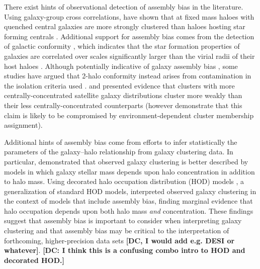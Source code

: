 \documentclass[usenatbib,fleqn]{mnras}
\begin{document}
There exist hints of observational detection of assembly bias in the literature. Using galaxy-group cross correlations, \citet{Yang_etal06} have shown that at fixed mass haloes with quenched central galaxies are more strongly clustered than haloes hosting star forming centrals \citep[see also][]{blanton_berlind07, wang_etal08, wang_etal13}. Additional support for assembly bias comes from the detection of galactic conformity \citep{weinmann_etal06}, which indicates that the star formation properties of galaxies are correlated over scales significantly larger than the virial radii of their host haloes \citep[2-halo conformity][]{kauffmann_etal13,kawinwan_etal16,berti_etal17}. Although potentially indicative of galaxy assembly bias \citep[e.g.,][]{hearin_etal15,hearin_etal16}, some studies have argued that 2-halo conformity instead arises from contamination in the isolation criteria used \citep{tinker_etal17, sin_etal17}. \citet{miyatake_etal16} and \citet{more_etal16} presented  evidence that clusters with more centrally-concentrated 
satellite galaxy distributions cluster more weakly than  their less centrally-concentrated counterparts (however \citealt{zu_mandelbaum16} demonstrate that this claim is likely to be compromised by environment-dependent cluster membership assignment). 

Additional hints of assembly bias come from efforts to infer statistically the parameters of the galaxy--halo relationship from galaxy clustering data. In particular, \citet{lehmann_etal17} demonstrated that observed galaxy clustering is better described by models in which galaxy stellar mass depends upon halo concentration in addition to halo mass. Using decorated halo occupation distribution (HOD) models \citep{hearin_etal16}, a generalization of standard HOD models, \citet{zentner_etal16} interpreted observed galaxy clustering in the context of models that include assembly bias, finding marginal evidence that halo occupation depends upon both halo mass {\em and} concentration. These findings suggest that assembly bias is important to consider when interpreting galaxy clustering and that assembly bias may be critical to the interpretation of forthcoming, higher-precision data sets {\bf [DC, I would add e.g. DESI or whatever]}. {\bf [DC: I think this is a confusing combo intro to HOD and decorated HOD.]}
\end{document}
